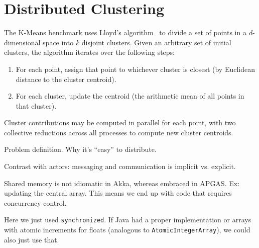 \section{Distributed \kmeans Clustering}

The K-Means benchmark uses Lloyd's algorithm~\cite{Lloyd1982Least} to divide a set of points in a $d$-dimensional space into $k$ disjoint clusters.
Given an arbitrary set of initial clusters, the algorithm iterates over the following steps:
\begin{enumerate}
  \item For each point, assign that point to whichever cluster is closest (by Euclidean distance to the cluster centroid).
  \item For each cluster, update the centroid (the arithmetic mean of all points in that cluster).
\end{enumerate}

Cluster contributions may be computed in parallel for each point, with two collective reductions across all processes to compute new cluster centroids.

Problem definition. Why it's ``easy'' to distribute.

Contrast with actors: messaging and communication is implicit vs. explicit.

Shared memory is not idiomatic in Akka, whereas embraced in APGAS. Ex: updating
the central array. This means we end up with code that requires concurrency
control.

Here we just used \lstinline{synchronized}. If Java had a proper
implementation or arrays with atomic increments for floats (analogous to
\lstinline{AtomicIntegerArray}), we could also just use that.
